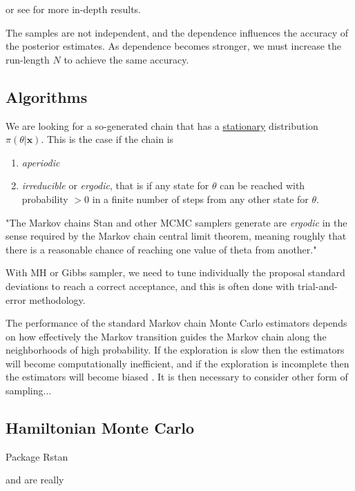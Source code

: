 \documentclass[11pt,a4paper,openany ]{book}
\begin{document}
or see \citet[section 2.2.3]{angelino_patterns_2016} for more in-depth results.

The samples are not independent, and the dependence influences the accuracy of the posterior estimates. As dependence becomes stronger, we must increase the run-length $N$ to achieve the same accuracy. 


\subsection{Algorithms} 

We are looking for a so-generated chain that has a \underline{stationary} distribution $\pi(\theta|\boldsymbol{x})$. This is the case if the chain is 

\begin{enumerate}
	\item \emph{aperiodic}
	\item \emph{irreducible} or \emph{ergodic}, that is if any state for $\theta$ can be reached with probability $>0$ in a finite number of steps from any other state for $\theta$.
\end{enumerate}

"The Markov chains Stan and other MCMC samplers generate are \emph{ergodic} in the
sense required by the Markov chain central limit theorem, meaning roughly that there
is a reasonable chance of reaching one value of theta from another." \cite{stan_stan_2016}

With MH or Gibbs sampler, we need to tune individually the proposal standard deviations to reach a correct acceptance, and this is often done with trial-and-error methodology. 



The  performance  of  the standard  Markov  chain  Monte  Carlo  estimators  depends  on  how  effectively the Markov transition guides the Markov chain along the neighborhoods of high probability.  If  the  exploration  is  slow  then  the  estimators  will  become  computationally inefficient,  and  if  the  exploration  is  incomplete  then  the  estimators  will  become  biased
\citet{betancourt_diagnosing_2016}. It is then necessary to consider other form of sampling...


\subsection{Hamiltonian Monte Carlo}

Package Rstan

\cite{neal_mcmc_2011} and \cite{betancourt_hamiltonian_2015} are really 
\end{document}
